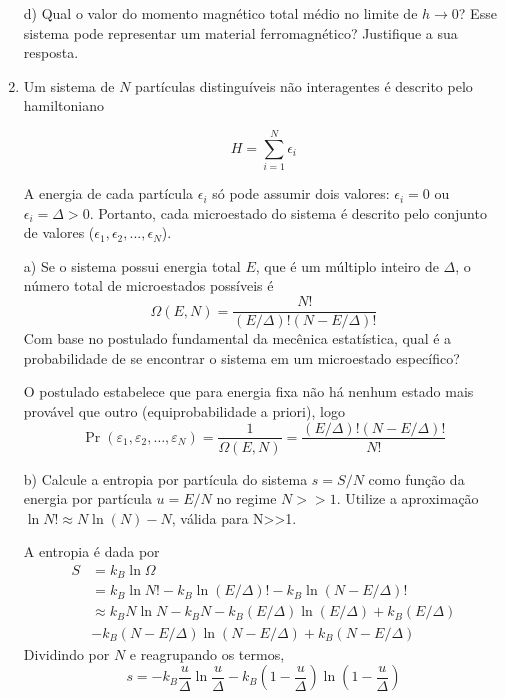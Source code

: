 \begin{enumerate}[start=1,label={\bfseries Q\arabic*.}]
  \resposta

  d) Qual o valor do momento magnético total médio no limite de $h \rightarrow 0$? Esse sistema pode representar um material ferromagnético? Justifique a sua resposta.

  \resposta



\item Um sistema de $N$ partículas distinguíveis não interagentes é descrito pelo hamiltoniano

\begin{equation}
  H = \sum_{i=1}^{N} \epsilon_{i}
\end{equation}

A energia de cada partícula $\epsilon_{i}$ só pode assumir dois valores: $\epsilon_{i} = 0$ ou $\epsilon_{i} = \Delta > 0$. Portanto, cada microestado do sistema é descrito pelo conjunto de valores ($\epsilon_{1}, \epsilon_{2},...,\epsilon_{N}$).


a) Se o sistema possui energia total $E$, que é um múltiplo inteiro de $\Delta$, o número total de microestados possíveis é
\begin{equation}
\Omega (E,N) = \frac{N!}{(E/\Delta)! (N - E/\Delta)!}
\end{equation}
Com base no postulado fundamental da mecênica estatística, qual é a probabilidade de se encontrar o sistema em um microestado específico?

\resposta O postulado estabelece que para energia fixa não há nenhum estado mais provável que outro (equiprobabilidade a priori), logo
$$
\operatorname{Pr}\left(\varepsilon_{1}, \varepsilon_{2}, \ldots, \varepsilon_{N}\right)=\frac{1}{\Omega(E, N)}=\frac{(E / \Delta) !(N-E / \Delta) !}{N !}
$$

b) Calcule a entropia por partícula do sistema $s = S/N$ como função da energia por partícula $u = E/N$ no regime $N>>1$. Utilize a aproximação $\operatorname{ln} N! \approx N \operatorname{ln}(N) - N$, válida para N>>1.

\resposta A entropia é dada por
$$
\begin{aligned}
S &=k_{B} \ln \Omega \\
&=k_{B} \ln N !-k_{B} \ln (E / \Delta) !-k_{B} \ln (N-E / \Delta) ! \\
& \approx k_{B} N \ln N-k_{B} N-k_{B}(E / \Delta) \ln (E / \Delta)+k_{B}(E / \Delta) \\
&-k_{B}(N-E / \Delta) \ln (N-E / \Delta)+k_{B}(N-E / \Delta)
\end{aligned}
$$
Dividindo por $N$ e reagrupando os termos,
$$
s=-k_{B} \frac{u}{\Delta} \ln \frac{u}{\Delta}-k_{B}\left(1-\frac{u}{\Delta}\right) \ln \left(1-\frac{u}{\Delta}\right)
$$


\end{enumerate}
